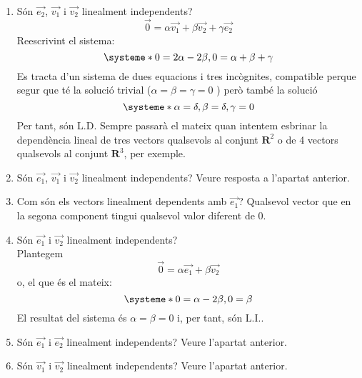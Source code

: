 \begin{enumerate}
  \item Són $\overrightarrow{e_2}$, $\overrightarrow{v_1}$ i $\overrightarrow{v_2}$ linealment independents?
  \[\vec{0} = \alpha \overrightarrow{v_1} + \beta \overrightarrow{v_2} + \gamma \overrightarrow{e_2}\]
  Reescrivint el sistema:
  \[
    \systeme*{0=2\alpha-2\beta, 0=\alpha+\beta+\gamma}
  \]
  Es tracta d'un sistema de dues equacions i tres incògnites, compatible perque segur que té la solució trivial ($\alpha=\beta=\gamma=0$ ) però també la solució
  \[
    \systeme*{\alpha=\delta,\beta=\delta,\gamma=0}
  \]
  Per tant, són L.D. Sempre passarà el mateix quan intentem esbrinar la dependència lineal de tres vectors qualsevols al conjunt $\mathbf{R}^2$ o de 4 vectors qualsevols al conjunt $\mathbf{R}^3$, per exemple.
  \item Són $\overrightarrow{e_1}$, $\overrightarrow{v_1}$ i $\overrightarrow{v_2}$ linealment independents?
  Veure resposta a l'apartat anterior.
  \item Com són els vectors linealment dependents amb $\overrightarrow{e_1}$?
  Qualsevol vector que en la segona component tingui qualsevol valor diferent de $0$.
  \item Són $\overrightarrow{e_1}$ i $\overrightarrow{v_2}$ linealment independents?\\
  Plantegem
  \[\vec{0} = \alpha \overrightarrow{e_1} + \beta \overrightarrow{v_2} \]
  o, el que és el mateix:
  \[
    \systeme*{0=\alpha-2\beta,0=\beta}
  \]
  El resultat del sistema és $\alpha=\beta=0$ i, per tant, són L.I..
  \item Són $\overrightarrow{e_1}$ i $\overrightarrow{e_2}$ linealment independents?
  Veure l'apartat anterior.
  \item Són $\overrightarrow{v_1}$ i $\overrightarrow{v_2}$ linealment independents?
  Veure l'apartat anterior.
\end{enumerate}
\blacksquare

